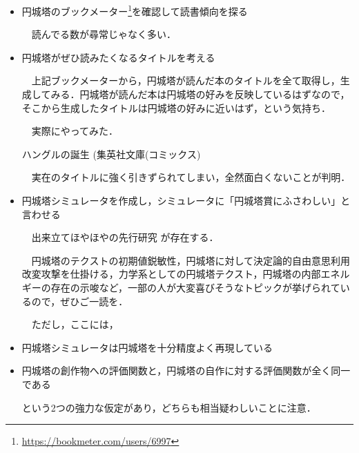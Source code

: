 \documentclass[10pt, a5paper, twoside]{jsarticle}
\theoremstyle{definition}
\begin{document}
		\begin{itemize}

			\item 円城塔のブックメーター\footnote{\url{https://bookmeter.com/users/6997}}を確認して読書傾向を探る

			\vspace{1mm}

			　読んでる数が尋常じゃなく多い．

			\vspace{2mm}

			\item 円城塔がぜひ読みたくなるタイトルを考える

			\vspace{1mm}

			　上記ブックメーターから，円城塔が読んだ本のタイトルを全て取得し，生成してみる．円城塔が読んだ本は円城塔の好みを反映しているはずなので，そこから生成したタイトルは円城塔の好みに近いはず，という気持ち．

			\vspace{2mm}

			　実際にやってみた．

			\begin{center}

				ハングルの誕生 (集英社文庫(コミックス)

			\end{center}

			　実在のタイトルに強く引きずられてしまい，全然面白くないことが判明．

			\vspace{2mm}

			\item 円城塔シミュレータを作成し，シミュレータに「円城塔賞にふさわしい」と言わせる

			\vspace{1mm}

			　出来立てほやほやの先行研究\cite{aki} が存在する．

			　円城塔のテクストの初期値鋭敏性，円城塔に対して決定論的自由意思利用改変攻撃を仕掛ける，力学系としての円城塔テクスト，円城塔の内部エネルギーの存在の示唆など，一部の人が大変喜びそうなトピックが挙げられているので，ぜひご一読を．

			　ただし，ここには，
　　　		
				\item 円城塔シミュレータは円城塔を十分精度よく再現している

				\item 円城塔の創作物への評価関数と，円城塔の自作に対する評価関数が全く同一である

			という2つの強力な仮定があり，どちらも相当疑わしいことに注意．

		\end{itemize}
\end{document}
